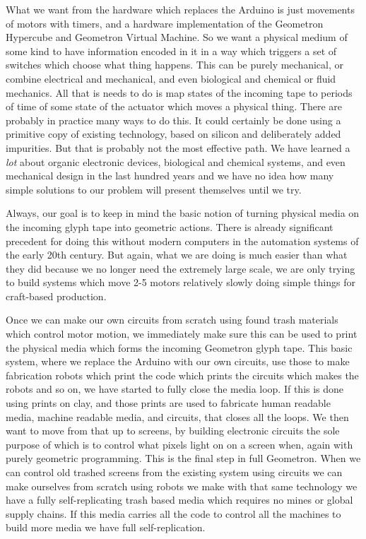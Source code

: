 What we want from the hardware which replaces the Arduino is just
movements of motors with timers, and a hardware implementation of the
Geometron Hypercube and Geometron Virtual Machine. So we want a physical
medium of some kind to have information encoded in it in a way which
triggers a set of switches which choose what thing happens. This can be
purely mechanical, or combine electrical and mechanical, and even
biological and chemical or fluid mechanics. All that is needs to do is
map states of the incoming tape to periods of time of some state of the
actuator which moves a physical thing. There are probably in practice
many ways to do this. It could certainly be done using a primitive copy
of existing technology, based on silicon and deliberately added
impurities. But that is probably not the most effective path. We have
learned a \emph{lot} about organic electronic devices, biological and
chemical systems, and even mechanical design in the last hundred years
and we have no idea how many simple solutions to our problem will
present themselves until we try.

Always, our goal is to keep in mind the basic notion of turning physical
media on the incoming glyph tape into geometric actions. There is
already significant precedent for doing this without modern computers in
the automation systems of the early 20th century. But again, what we are
doing is much easier than what they did because we no longer need the
extremely large scale, we are only trying to build systems which move
2-5 motors relatively slowly doing simple things for craft-based
production.

Once we can make our own circuits from scratch using found trash
materials which control motor motion, we immediately make sure this can
be used to print the physical media which forms the incoming Geometron
glyph tape. This basic system, where we replace the Arduino with our own
circuits, use those to make fabrication robots which print the code
which prints the circuits which makes the robots and so on, we have
started to fully close the media loop. If this is done using prints on
clay, and those prints are used to fabricate human readable media,
machine readable media, and circuits, that closes all the loops. We then
want to move from that up to screens, by building electronic circuits
the sole purpose of which is to control what pixels light on on a screen
when, again with purely geometric programming. This is the final step in
full Geometron. When we can control old trashed screens from the
existing system using circuits we can make ourselves from scratch using
robots we make with that same technology we have a fully
self-replicating trash based media which requires no mines or global
supply chains. If this media carries all the code to control all the
machines to build more media we have full self-replication.

